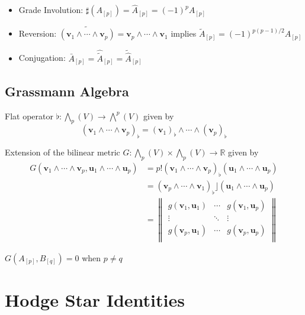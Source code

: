 \documentclass[12pt]{article}
\begin{document}
\begin{itemize}
	\item Grade Involution: $\sharp(A_{[p]}) = \widehat{A}_{[p]} = (-1)^p A_{[p]}$ \\
	\item Reversion: $\widetilde{(\bm{v}_1 \wedge \cdots \wedge \bm{v}_p)} = \bm{v}_p \wedge \cdots \wedge \bm{v}_1$ implies $\widetilde{A}_{[p]} = (-1)^{p(p-1)/2} A_{[p]}$
	\item Conjugation: $\bar{A}_{[p]} = \widehat{\widetilde{A}}_{[p]} = \widetilde{\widehat{A}}_{[p]}$
\end{itemize}



\subsection{Grassmann Algebra}
Flat operator $\flat: \bigwedge_p(V) \to \bigwedge^p(V)$ given by $$ (\bm{v}_1\wedge\cdots\wedge\bm{v}_p)_\flat = (\bm{v}_{1})_\flat \wedge \cdots \wedge (\bm{v}_{p})_\flat$$

Extension of the bilinear metric $G: \bigwedge_p(V)\times \bigwedge_p(V) \to \mathbb{R}$ given by 
$$
\begin{aligned}
	G(\bm{v}_1\wedge\cdots\wedge\bm{v}_p, \bm{u}_1\wedge\cdots\wedge\bm{u}_p) &= p!(\bm{v}_1\wedge\cdots\wedge\bm{v}_p)_\flat (\bm{u}_1\wedge\cdots\wedge\bm{u}_p) \\
	&= (\bm{v}_p\wedge\cdots\wedge\bm{v}_1)_\flat \rfloor (\bm{u}_1\wedge\cdots\wedge\bm{u}_p) \\
	&= \begin{Vmatrix}
		g(\bm{v}_1, \bm{u}_1) & \cdots & g(\bm{v}_1, \bm{u}_p) \\
		\vdots           &  \ddots  & \vdots \\
		g(\bm{v}_p, \bm{u}_1) & \cdots & g(\bm{v}_p, \bm{u}_p) \\
	\end{Vmatrix}
\end{aligned}
$$

$G(A_{[p]}, B_{[q]}) = 0$ when $p\neq q$

\section*{Hodge Star Identities}
\end{document}
